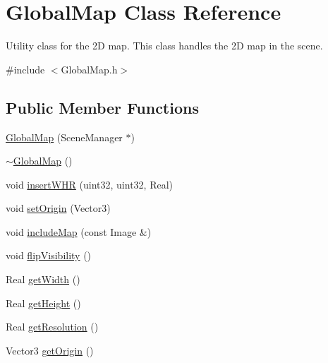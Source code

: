 \hypertarget{classGlobalMap}{\section{\-Global\-Map \-Class \-Reference}
\label{classGlobalMap}
}


\-Utility class for the 2\-D map. \-This class handles the 2\-D map in the scene.  




{\ttfamily \#include $<$\-Global\-Map.\-h$>$}

\subsection*{\-Public \-Member \-Functions}
\begin{DoxyCompactItemize}
\item 
\hyperlink{classGlobalMap_a308deb321ce23efd983e1b531610fe74}{\-Global\-Map} (\-Scene\-Manager $\ast$)
\item 
\hyperlink{classGlobalMap_a72b4215462449c75b7758df8f6b34097}{$\sim$\-Global\-Map} ()
\item 
void \hyperlink{classGlobalMap_aeb2b21e3ddde44e8999837dd69445d9d}{insert\-W\-H\-R} (uint32, uint32, \-Real)
\item 
void \hyperlink{classGlobalMap_a1563668430b40d8714d1b276f54c544a}{set\-Origin} (\-Vector3)
\item 
void \hyperlink{classGlobalMap_aa3bb0eeddafa5949d86c3324ada09f6f}{include\-Map} (const \-Image \&)
\item 
void \hyperlink{classGlobalMap_a355f582edb923cc85a6ca3967f6cd70e}{flip\-Visibility} ()
\item 
\-Real \hyperlink{classGlobalMap_add6bc1a0cd3c67142d4e0839b285a03b}{get\-Width} ()
\item 
\-Real \hyperlink{classGlobalMap_a470de4de22c822d7fbb448775bd51be4}{get\-Height} ()
\item 
\-Real \hyperlink{classGlobalMap_a5b489c16007ddad138c9ad4b5ed9c4cf}{get\-Resolution} ()
\item 
\-Vector3 \hyperlink{classGlobalMap_a6263c44606f891c5ed167e58a7690597}{get\-Origin} ()
\end{DoxyCompactItemize}
